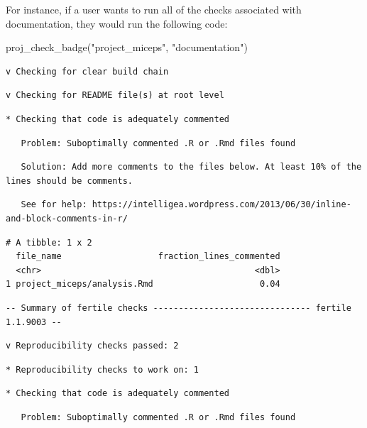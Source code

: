 \documentclass[12pt,twoside]{reedthesis}
\newenvironment{Shaded}{\begin{snugshade}}{\end{snugshade}}
\newcommand{\FunctionTok}[1]{\textcolor[rgb]{0.00,0.00,0.00}{#1}}
\newcommand{\NormalTok}[1]{#1}
\newcommand{\StringTok}[1]{\textcolor[rgb]{0.31,0.60,0.02}{#1}}
\begin{document}
For instance, if a user wants to run all of the checks associated with documentation, they would run the following code:
\begin{Shaded}
\begin{Highlighting}[]
\FunctionTok{proj\_check\_badge}\NormalTok{(}\StringTok{"project\_miceps"}\NormalTok{, }\StringTok{"documentation"}\NormalTok{)}
\end{Highlighting}
\end{Shaded}
\begin{verbatim}
v Checking for clear build chain
\end{verbatim}
\begin{verbatim}
v Checking for README file(s) at root level
\end{verbatim}
\begin{verbatim}
* Checking that code is adequately commented
\end{verbatim}
\begin{verbatim}
   Problem: Suboptimally commented .R or .Rmd files found
\end{verbatim}
\begin{verbatim}
   Solution: Add more comments to the files below. At least 10% of the lines should be comments.
\end{verbatim}
\begin{verbatim}
   See for help: https://intelligea.wordpress.com/2013/06/30/inline-and-block-comments-in-r/
\end{verbatim}
\begin{verbatim}
# A tibble: 1 x 2
  file_name                   fraction_lines_commented
  <chr>                                          <dbl>
1 project_miceps/analysis.Rmd                     0.04
\end{verbatim}
\begin{verbatim}
-- Summary of fertile checks ------------------------------- fertile 1.1.9003 --
\end{verbatim}
\begin{verbatim}
v Reproducibility checks passed: 2
\end{verbatim}
\begin{verbatim}
* Reproducibility checks to work on: 1
\end{verbatim}
\begin{verbatim}
* Checking that code is adequately commented
\end{verbatim}
\begin{verbatim}
   Problem: Suboptimally commented .R or .Rmd files found
\end{verbatim}
\end{document}
